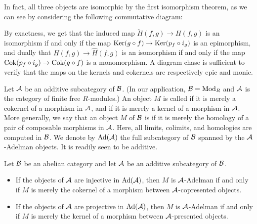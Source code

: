 In fact, all three objects are isomorphic by the first isomorphism theorem, as we can see by considering the following commutative diagram:
\begin{center}
\end{center}
By exactness, we get that the induced map $\check{H}(f,g) \to H(f,g)$ is an isomorphism if and only if the map $\operatorname{Ker}(g\circ f) \to \operatorname{Ker}(p_f \circ i_g)$ is an epimorphism, and dually that $H(f,g) \to \hat{H}(f,g)$ is an isomorphism if and only if the map $\operatorname{Cok}(p_f \circ i_g) \to \operatorname{Cok}(g \circ f)$ is a monomorphism.
A diagram chase is sufficient to verify that the maps on the kernels and cokernels are respectively epic and monic.

Let $\mathcal{A}$ be an additive subcategory of $\mathcal{B}$.
(In our application, $\mathcal{B} = \textup{Mod}_{R}$ and $\mathcal{A}$ is the category of finite free $R$-modules.)
An object $M$ is called  if it is merely a cokernel of a morphism in $\mathcal{A}$, and  if it is merely a kernel of a morphism in $\mathcal{A}$.
More generally, we say that an object $M$ of $\mathcal{B}$ is  if it is merely the homology of a pair of composable morphisms in $\mathcal{A}$.
Here, all limits, colimits, and homologies are computed in $\mathcal{B}$.
We denote by $\textup{Ad}(\mathcal{A})$ the full subcategory of $\mathcal{B}$ spanned by the $\mathcal{A}$-Adelman objects.
It is readily seen to be additive.

\begin{lemma}\label{lem:adel-desc}
  Let $\mathcal{B}$ be an abelian category and let $\mathcal{A}$ be an additive subcategory of $\mathcal{B}$.
  \begin{itemize}[noitemsep]
    \item If the objects of $\mathcal{A}$ are injective in $\textup{Ad}(\mathcal{A})$, then $M$ is $\mathcal{A}$-Adelman if and only if $M$ is merely the cokernel of a morphism between $\mathcal{A}$-copresented objects.
  \item If the objects of $\mathcal{A}$ are projective in $\textup{Ad}(\mathcal{A})$, then $M$ is $\mathcal{A}$-Adelman if and only if $M$ is merely the kernel of a morphism between $\mathcal{A}$-presented objects.
  \end{itemize}
\end{lemma}

